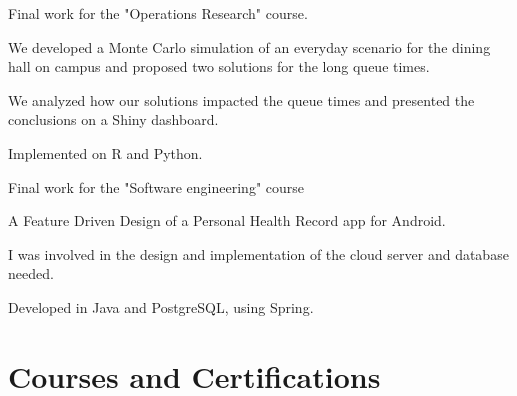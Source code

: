 \documentclass[]{deedy-resume-openfont}
\begin{document}
\begin{minipage}[t]{0.66\textwidth}
\begin{tightemize}
\item Final work for the "Operations Research" course.
\item We developed a Monte Carlo simulation of an everyday scenario for the dining hall on campus and proposed two solutions for the long queue times.
\item We analyzed how our solutions impacted the queue times and presented the conclusions on a Shiny dashboard.
\item Implemented on R and Python.
\end{tightemize}
\sectionsep

\begin{tightemize}
\item Final work for the "Software engineering" course
\item A Feature Driven Design of a Personal Health Record app for Android.
\item I was involved in the design and implementation of the cloud server and database needed.
\item Developed in Java and PostgreSQL, using Spring.
\end{tightemize}
\sectionsep


\sectionsep


\section{Courses and Certifications} 


\end{minipage}
\end{document}
